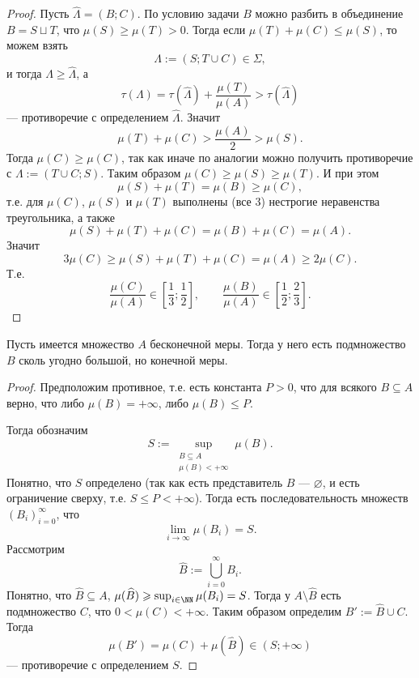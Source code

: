 \documentclass[12pt,a4paper]{article}
\begin{document}
\begin{enumproblem}
\begin{proof}
            Пусть $\widehat{\Lambda} = (B; C)$. По условию задачи $B$ можно разбить в объединение $B = S \sqcup T$, что $\mu(S) \geqslant \mu(T) > 0$. Тогда если $\mu(T) + \mu(C) \leqslant \mu(S)$, то можем взять
            \[\Lambda := (S; T \cup C) \in \Sigma,\]
            и тогда $\Lambda \geqslant \widehat{\Lambda}$, а
            \[\tau(\Lambda) = \tau(\widehat{\Lambda}) + \frac{\mu(T)}{\mu(A)} > \tau(\widehat{\Lambda})\]
            --- противоречие с определением $\widehat{\Lambda}$. Значит
            \[
                \mu(T) + \mu(C) > \frac{\mu(A)}{2} > \mu(S).
            \]
            Тогда $\mu(C) \geqslant \mu(C)$, так как иначе по аналогии можно получить противоречие с $\Lambda := (T \cup C; S)$. Таким образом $\mu(C) \geqslant \mu(S) \geqslant \mu(T)$. И при этом
            \[\mu(S) + \mu(T) = \mu(B) \geqslant \mu(C),\]
            т.е. для $\mu(C)$, $\mu(S)$ и $\mu(T)$ выполнены (все 3) нестрогие неравенства треугольника, а также
            \[\mu(S) + \mu(T) + \mu(C) = \mu(B) + \mu(C) = \mu(A).\]
            Значит
            \[3 \mu(C) \geqslant \mu(S) + \mu(T) + \mu(C) = \mu(A) \geqslant 2\mu(C).\]
            Т.е.
            \[\frac{\mu(C)}{\mu(A)} \in \left[\frac{1}{3}; \frac{1}{2}\right], \qquad \frac{\mu(B)}{\mu(A)} \in \left[\frac{1}{2}; \frac{2}{3}\right].\]
        \end{proof}

        \begin{lemma}\label{big-finite-set-lemma}
            Пусть имеется множество $A$ бесконечной меры. Тогда у него есть подмножество $B$ сколь угодно большой, но конечной меры.
        \end{lemma}

        \begin{proof}
            Предположим противное, т.е. есть константа $P > 0$, что для всякого $B \subseteq A$ верно, что либо $\mu(B) = +\infty$, либо $\mu(B) \leqslant P$.

            Тогда обозначим
            \[S := \sup_{\substack{B \subseteq A\\ \mu(B) < +\infty}} \mu(B).\]
            Понятно, что $S$ определено (так как есть представитель $B$ --- $\varnothing$, и есть ограничение сверху, т.е. $S \leqslant P < +\infty$). Тогда есть последовательность множеств $(B_i)_{i=0}^\infty$, что
            \[\lim_{i \to \infty} \mu(B_i) = S.\]
            Рассмотрим
            \[\widehat{B} := \bigcup_{i=0}^\infty B_i.\]
            Понятно, что $\widehat{B} \subseteq A$, $\mu(\widehat{B}) \geqslant \sup_{i \in \NN} \mu(B_i) = S$. Тогда у $A \setminus \widehat{B}$ есть подмножество $C$, что $0 < \mu(C) < +\infty$. Таким образом определим $B' := \widehat{B} \cup C$. Тогда
            \[\mu(B') = \mu(C) + \mu(\widehat{B}) \in (S; +\infty)\]
            --- противоречие с определением $S$.
        \end{proof}


\end{enumproblem}
\end{document}
